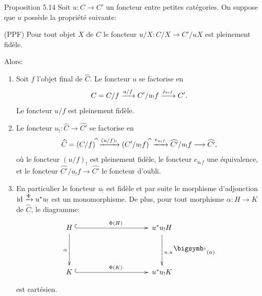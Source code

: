 \documentclass[10pt]{../fichiers-configuration-latex/smfart}
\def\labelenumi{(\theenumi)}
\begin{document}
\begin{enonce*}{Proposition 5.14}
Soit $u:C\rightarrow C'$ un foncteur entre petites catégories. On
suppose que $u$ possède la propriété suivante:

{\rm(PPF)} Pour tout objet $X$ de $C$ le foncteur
$u/X:C/X\rightarrow C'/uX$ est pleinement fidèle.

Alors:
\begin{enumerate}
\renewcommand{\labelenumi}{\theenumi)}
\item Soit $f$ l'objet final de $\widehat{C}$. Le
  foncteur $u$ se factorise en
$$
C=C/f\xrightarrow{u/f}C'/u_{!}f\xrightarrow{j_{u_{!}f}} C'{}.
$$
Le foncteur $u/f$ est pleinement fidèle.

\item Le foncteur $u_{!}:\widehat{C}\rightarrow
  \widehat{C'}$ se factorise en
$$
\widehat{C}=(C/f)^{\widehat{\phantom{,}}}\xrightarrow{(u/f)_{!}}
(C'/u_{!}f)^{\widehat{\phantom{,}}}\xrightarrow{e_{u_{!}f}}\widehat{C'}/u_{!}f\longrightarrow
\widehat{C'}{},
$$
où le foncteur $(u/f)_{!}$ est pleinement fidèle, le foncteur
$e_{u_{!}f}$ une équivalence, et le foncteur
$\widehat{C'}/u_{!}f\rightarrow
\widehat{C'}$ le foncteur d'oubli.

\item En particulier le foncteur $u_{!}$ est fidèle et par suite le
  morphisme d'adjonction $\operatorname{id}\xrightarrow{\Phi}u^\ast u_{!}$ est un
  monomorphisme. De plus, pour tout morphisme $\alpha:H\rightarrow K$
  de $\widehat{C}$, le diagramme:
\[
\xymatrix@C=3.5cm@R=1.5cm@M=.2cm{
H \ar@{^{(}->}[r]^{\Phi(H)}\ar[d]_{\alpha} & u^{*}u_{!}H \ar[d]^{u.u^{\bigdot}(\alpha)}\\
K \ar@{^{(}->}[r]^{\Phi(K)} &  u^{*}u_!K }
\]
est cartésien.
\end{enumerate}
\end{enonce*}
\end{document}
